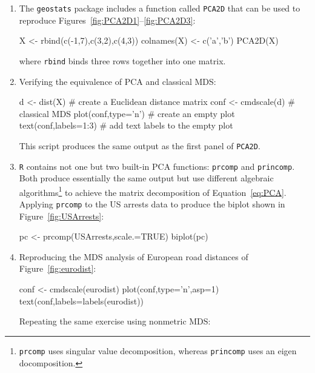 \begin{enumerate}

\item The \texttt{geostats} package includes a function called
  \texttt{PCA2D} that can be used to reproduce
  Figures~\ref{fig:PCA2D1}--\ref{fig:PCA2D3}:

\begin{script}
X <- rbind(c(-1,7),c(3,2),c(4,3))
colnames(X) <- c('a','b')
PCA2D(X)
\end{script}

\noindent where \texttt{rbind} binds three rows together into one
matrix.

\item Verifying the equivalence of PCA and classical MDS:

\begin{script}[firstnumber=3]
d <- dist(X)           # create a Euclidean distance matrix
conf <- cmdscale(d)    # classical MDS
plot(conf,type='n')    # create an empty plot
text(conf,labels=1:3)  # add text labels to the empty plot
\end{script}

This script produces the same output as the first panel of
\texttt{PCA2D}.

\item \texttt{R} contains not one but two built-in PCA functions:
  \texttt{prcomp} and \texttt{princomp}. Both produce essentially the
  same output but use different algebraic
  algorithms\footnote{\texttt{prcomp} uses singular value
    decomposition, whereas \texttt{princomp} uses an eigen
    docomposition.} to achieve the matrix decomposition of
  Equation~\ref{eq:PCA}. Applying \texttt{prcomp} to the US arrests
  data to produce the biplot shown in Figure~\ref{fig:USArrests}:

\begin{script}
pc <- prcomp(USArrests,scale.=TRUE)
biplot(pc)
\end{script}

\item Reproducing the MDS analysis of European road distances of
  Figure~\ref{fig:eurodist}:

\begin{script}
conf <- cmdscale(eurodist)
plot(conf,type='n',asp=1)
text(conf,labels=labels(eurodist))
\end{script}

Repeating the same exercise using nonmetric MDS:



\end{enumerate}
